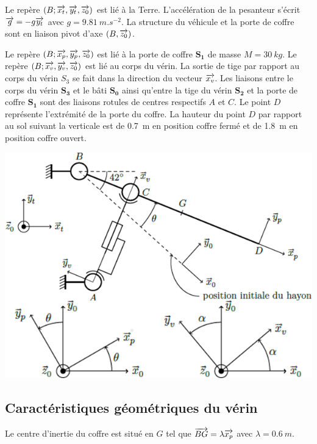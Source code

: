 \documentclass[10pt,fleqn]{article} %
\begin{document}
\begin{multicols}{2}
\begin{multicols}{2}
Le repère $\left(B;\overrightarrow{x_t},\overrightarrow{y_t},\overrightarrow{z_0} \right)$ est lié à la Terre. L’accélération de la pesanteur s’écrit $\overrightarrow{g}=-g\overrightarrow{y_t}$ avec $g=\SI{9,81}{m.s^{-2}}$. La structure du véhicule et la porte de coffre sont en liaison pivot d’axe $\left(B,\overrightarrow{z_0}\right)$.

Le repère $\left(B;\overrightarrow{x_p},\overrightarrow{y_p},\overrightarrow{z_0} \right)$ est lié à la porte de coffre \textbf{$\bm{S_1}$} de masse $M=\SI{30}{kg}$. Le repère $\left(B;\overrightarrow{x_v},\overrightarrow{y_v},\overrightarrow{z_0} \right)$ est lié au corps du vérin. La sortie
de tige par rapport au corps du vérin \textbf{$S_3$} se fait dans la direction du vecteur $\overrightarrow{x_v}$.
Les liaisons entre le corps du vérin \textbf{$\bm{S_3}$} et le bâti \textbf{$\bm{S_0}$} ainsi qu'entre la tige du vérin \textbf{$\bm{S_2}$} et la porte de coffre \textbf{$\bm{S_1}$} sont des liaisons rotules de centres respectifs $A$ et $C$.
Le point $D$ représente l’extrémité de la porte du coffre. La hauteur du point $D$ par rapport au sol suivant la
verticale est de \SI{0,7}{m} en position coffre fermé et de \SI{1,8}{m} en position coffre ouvert.

\vspace{-.5cm}

\begin{center}
\includegraphics[width=.8\linewidth]{images/fig_01_bis}
\end{center}
\fi

\vspace{-.5cm}

\subsection*{Caractéristiques géométriques du vérin}
\ifprof
\else
Le centre d’inertie du coffre est situé en $G$ tel que $\overrightarrow{BG}=\lambda\overrightarrow{x_p}$ avec $\lambda=\SI{0,6}{m}$.


\end{multicols}
\end{multicols}
\end{document}
